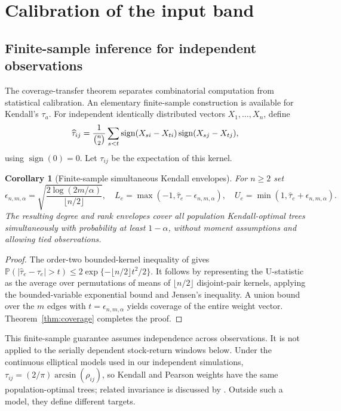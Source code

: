 \documentclass[pdflatex,sn-mathphys-ay]{sn-jnl}
\theoremstyle{thmstyleone}
\newtheorem{corollary}[theorem]{Corollary}
\theoremstyle{thmstyletwo}
\newcommand{\Prob}{\mathbb P}
\begin{document}
\section{Calibration of the input band}\label{sec:calibration}
\subsection{Finite-sample inference for independent observations}
The coverage-transfer theorem separates combinatorial computation from statistical calibration. An elementary finite-sample construction is available for Kendall's $\tau_a$. For independent identically distributed vectors $X_1,\ldots,X_n$, define
\[
 \widehat\tau_{ij}={1\over {n\choose2}}\sum_{s<t}
 \operatorname{sign}(X_{si}-X_{ti})\operatorname{sign}(X_{sj}-X_{tj}),
\]
using $\operatorname{sign}(0)=0$. Let $\tau_{ij}$ be the expectation of this kernel.

\begin{corollary}[Finite-sample simultaneous Kendall envelopes]\label{cor:kendall}
For $n\ge2$ set
\begin{equation}\label{eq:kendall}
 \epsilon_{n,m,\alpha}=\sqrt{\frac{2\log(2m/\alpha)}{\lfloor n/2\rfloor}},\quad
 L_e=\max(-1,\widehat\tau_e-\epsilon_{n,m,\alpha}),\quad
 U_e=\min(1,\widehat\tau_e+\epsilon_{n,m,\alpha}).
\end{equation}
The resulting degree and rank envelopes cover all population Kendall-optimal trees simultaneously with probability at least $1-\alpha$, without moment assumptions and allowing tied observations.
\end{corollary}
\begin{proof}
The order-two bounded-kernel inequality of \citet{hoeffding1963} gives
\(\Prob(|\widehat\tau_e-\tau_e|>t)\le2\exp\{-\lfloor n/2\rfloor t^2/2\}\).
It follows by representing the U-statistic as the average over permutations of means of $\lfloor n/2\rfloor$ disjoint-pair kernels, applying the bounded-variable exponential bound and Jensen's inequality. A union bound over the $m$ edges with $t=\epsilon_{n,m,\alpha}$ yields coverage of the entire weight vector. Theorem~\ref{thm:coverage} completes the proof.
\end{proof}
This finite-sample guarantee assumes independence across observations. It is not applied to the serially dependent stock-return windows below. Under the continuous elliptical models used in our independent simulations, $\tau_{ij}=(2/\pi)\arcsin(\rho_{ij})$, so Kendall and Pearson weights have the same population-optimal trees; related invariance is discussed by \citet{kalyagin2022}. Outside such a model, they define different targets.
\end{document}
